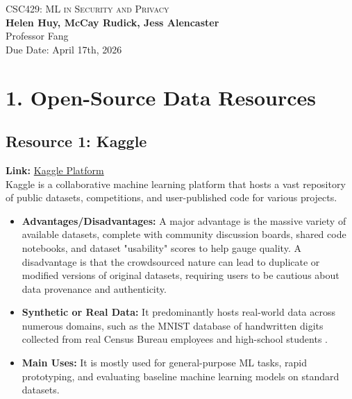 \documentclass[letterpaper]{article}
\newcommand{\labTitle}{ML in Security and Privacy}
\newcommand{\labDueDate}{April 17th, 2026}
\newcommand{\labClass}{CSC429}
\newcommand{\labClassTime}{}
\newcommand{\labClassInstructor}{Professor Fang}
\newcommand{\labAuthorName}{\textbf{Helen Huy, McCay Rudick, Jess Alencaster}}
\begin{document}
\thispagestyle{empty}


\vspace*{\fill}
\begin{center}
    {\Huge \scshape \labClass: \labTitle} \\ \vspace{10pt}
    {\Large \labAuthorName} \\ \vspace{5pt}
    {\large \labClassInstructor \ \labClassTime} \\ \vspace{5pt}
    {\large Due Date: \labDueDate}
\end{center} 
\vspace*{\fill}

\newpage

\section{1. Open-Source Data Resources}

\subsection*{Resource 1: Kaggle} 
\textbf{Link:} \href{https://www.kaggle.com/}{Kaggle Platform} \\
Kaggle is a collaborative machine learning platform that hosts a vast repository of public datasets, competitions, and user-published code for various projects.
\begin{itemize}
    \item \textbf{Advantages/Disadvantages:} A major advantage is the massive variety of available datasets, complete with community discussion boards, shared code notebooks, and dataset "usability" scores to help gauge quality. A disadvantage is that the crowdsourced nature can lead to duplicate or modified versions of original datasets, requiring users to be cautious about data provenance and authenticity.
    \item \textbf{Synthetic or Real Data:} It predominantly hosts real-world data across numerous domains, such as the MNIST database of handwritten digits collected from real Census Bureau employees and high-school students \parencite{mnist}.
    \item \textbf{Main Uses:} It is mostly used for general-purpose ML tasks, rapid prototyping, and evaluating baseline machine learning models on standard datasets.
\end{itemize}
\end{document}
